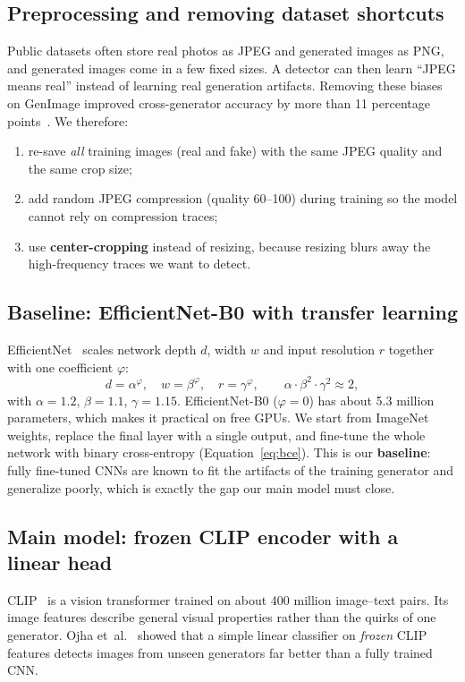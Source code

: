 \documentclass[11pt,a4paper]{article}
\begin{document}
\subsection{Preprocessing and removing dataset shortcuts}
Public datasets often store real photos as JPEG and generated images as PNG, and generated
images come in a few fixed sizes. A detector can then learn ``JPEG means real'' instead of
learning real generation artifacts. Removing these biases on GenImage improved cross-generator
accuracy by more than 11 percentage points~\cite{fakeorjpeg}. We therefore:
\begin{enumerate}
  \item re-save \emph{all} training images (real and fake) with the same JPEG quality and the same
        crop size;
  \item add random JPEG compression (quality 60--100) during training so the model cannot rely on
        compression traces;
  \item use \textbf{center-cropping} instead of resizing, because resizing blurs away the
        high-frequency traces we want to detect.
\end{enumerate}

\subsection{Baseline: EfficientNet-B0 with transfer learning}
EfficientNet~\cite{efficientnet} scales network depth $d$, width $w$ and input resolution $r$
together with one coefficient $\varphi$:
\begin{equation}
  d=\alpha^{\varphi},\quad w=\beta^{\varphi},\quad r=\gamma^{\varphi},
  \qquad \alpha\cdot\beta^{2}\cdot\gamma^{2}\approx 2,
\end{equation}
with $\alpha=1.2$, $\beta=1.1$, $\gamma=1.15$. EfficientNet-B0 ($\varphi=0$) has about 5.3 million
parameters, which makes it practical on free GPUs. We start from ImageNet weights, replace the
final layer with a single output, and fine-tune the whole network with binary cross-entropy
(Equation~\ref{eq:bce}). This is our \textbf{baseline}: fully fine-tuned CNNs are known to fit the
artifacts of the training generator and generalize poorly, which is exactly the gap our main
model must close.

\subsection{Main model: frozen CLIP encoder with a linear head}
CLIP~\cite{clip} is a vision transformer trained on about 400 million image--text pairs. Its image
features describe general visual properties rather than the quirks of one generator. Ojha
et~al.~\cite{ojha} showed that a simple linear classifier on \emph{frozen} CLIP features detects
images from unseen generators far better than a fully trained CNN.
\end{document}

